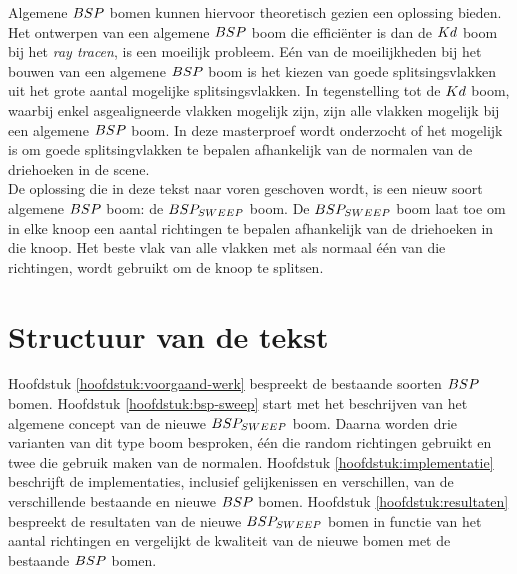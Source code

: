 Algemene $BSP$ bomen kunnen hiervoor theoretisch gezien een oplossing bieden.
Het ontwerpen van een algemene $BSP$ boom die efficiënter is dan de $Kd$ boom bij het \textit{ray tracen}, is een moeilijk probleem.
Eén van de moeilijkheden bij het bouwen van een algemene $BSP$ boom is het kiezen van goede splitsingsvlakken uit het grote aantal mogelijke splitsingsvlakken.
In tegenstelling tot de $Kd$ boom, waarbij enkel asgealigneerde vlakken mogelijk zijn, zijn alle vlakken mogelijk bij een algemene $BSP$ boom.
In deze masterproef wordt onderzocht of het mogelijk is om goede splitsingvlakken te bepalen afhankelijk van de normalen van de driehoeken in de scene.\\

De oplossing die in deze tekst naar voren geschoven wordt, is een nieuw soort algemene $BSP$ boom: de $BSP_{SWEEP}$ boom.
De $BSP_{SWEEP}$ boom laat toe om in elke knoop een aantal richtingen te bepalen afhankelijk van de driehoeken in die knoop.
Het beste vlak van alle vlakken met als normaal één van die richtingen, wordt gebruikt om de knoop te splitsen.

\section{Structuur van de tekst}
Hoofdstuk \ref{hoofdstuk:voorgaand-werk} bespreekt de bestaande soorten $BSP$ bomen. Hoofdstuk \ref{hoofdstuk:bsp-sweep} start met het beschrijven van het algemene concept van de nieuwe $BSP_{SWEEP}$ boom. Daarna worden drie varianten van dit type boom besproken, één die random richtingen gebruikt en twee die gebruik maken van de normalen. Hoofdstuk \ref{hoofdstuk:implementatie} beschrijft de implementaties, inclusief gelijkenissen en verschillen, van de verschillende bestaande en nieuwe $BSP$ bomen. Hoofdstuk \ref{hoofdstuk:resultaten} bespreekt de resultaten van de nieuwe $BSP_{SWEEP}$ bomen in functie van het aantal richtingen en vergelijkt de kwaliteit van de nieuwe bomen met de bestaande $BSP$ bomen.

